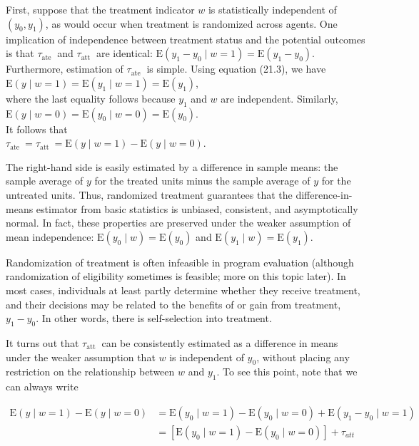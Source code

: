 \documentclass[10pt]{article}
\begin{document}
First, suppose that the treatment indicator $w$ is statistically independent of $\left(y_{0}, y_{1}\right)$, as would occur when treatment is randomized across agents. One implication of independence between treatment status and the potential outcomes is that $\tau_{\text {ate }}$ and $\tau_{\text {att }}$ are identical: $\mathrm{E}\left(y_{1}-y_{0} \mid w=1\right)=\mathrm{E}\left(y_{1}-y_{0}\right)$. Furthermore, estimation of $\tau_{\text {ate }}$ is simple. Using equation (21.3), we have\\
$\mathrm{E}(y \mid w=1)=\mathrm{E}\left(y_{1} \mid w=1\right)=\mathrm{E}\left(y_{1}\right)$,\\
where the last equality follows because $y_{1}$ and $w$ are independent. Similarly,\\
$\mathrm{E}(y \mid w=0)=\mathrm{E}\left(y_{0} \mid w=0\right)=\mathrm{E}\left(y_{0}\right)$.\\
It follows that\\
$\tau_{\text {ate }}=\tau_{\text {att }}=\mathrm{E}(y \mid w=1)-\mathrm{E}(y \mid w=0)$.

The right-hand side is easily estimated by a difference in sample means: the sample average of $y$ for the treated units minus the sample average of $y$ for the untreated units. Thus, randomized treatment guarantees that the difference-in-means estimator from basic statistics is unbiased, consistent, and asymptotically normal. In fact, these properties are preserved under the weaker assumption of mean independence: $\mathrm{E}\left(y_{0} \mid w\right)=\mathrm{E}\left(y_{0}\right)$ and $\mathrm{E}\left(y_{1} \mid w\right)=\mathrm{E}\left(y_{1}\right)$.

Randomization of treatment is often infeasible in program evaluation (although randomization of eligibility sometimes is feasible; more on this topic later). In most cases, individuals at least partly determine whether they receive treatment, and their decisions may be related to the benefits of or gain from treatment, $y_{1}-y_{0}$. In other words, there is self-selection into treatment.

It turns out that $\tau_{\text {att }}$ can be consistently estimated as a difference in means under the weaker assumption that $w$ is independent of $y_{0}$, without placing any restriction on the relationship between $w$ and $y_{1}$. To see this point, note that we can always write


\begin{align*}
\mathrm{E}(y \mid w=1)-\mathrm{E}(y \mid w=0) & =\mathrm{E}\left(y_{0} \mid w=1\right)-\mathrm{E}\left(y_{0} \mid w=0\right)+\mathrm{E}\left(y_{1}-y_{0} \mid w=1\right) \\
& =\left[\mathrm{E}\left(y_{0} \mid w=1\right)-\mathrm{E}\left(y_{0} \mid w=0\right)\right]+\tau_{a t t} \tag{21.5}
\end{align*}
\end{document}
